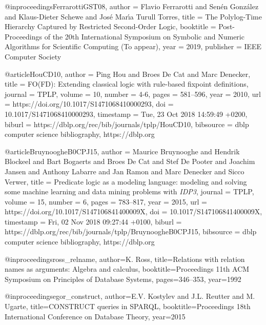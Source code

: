 \documentclass{article}
\begin{document}


@inproceedings{FerrarottiGST08,
  author    = {Flavio Ferrarotti and
               Sen{\'{e}}n Gonz{\'{a}}lez and
               Klaus-Dieter Schewe and
               Jos{\'{e}} Mar\'{\i}a {Turull Torres}},
  title     = {The Polylog-Time Hierarchy Captured by Restricted Second-Order Logic},
  booktitle = {Post-Proceedings of the 20th International Symposium on Symbolic and Numeric Algorithms for Scientific Computing (To appear)},
  year = {2019},
  publisher = {IEEE Computer Society}
}

@article{HouCD10,
  author    = {Ping Hou and
               Broes De Cat and
               Marc Denecker},
  title     = {{FO(FD):} Extending classical logic with rule-based fixpoint definitions},
  journal   = {{TPLP}},
  volume    = {10},
  number    = {4-6},
  pages     = {581--596},
  year      = {2010},
  url       = {https://doi.org/10.1017/S1471068410000293},
  doi       = {10.1017/S1471068410000293},
  timestamp = {Tue, 23 Oct 2018 14:59:49 +0200},
  biburl    = {https://dblp.org/rec/bib/journals/tplp/HouCD10},
  bibsource = {dblp computer science bibliography, https://dblp.org}
}

@article{BruynoogheB0CPJ15,
  author    = {Maurice Bruynooghe and
               Hendrik Blockeel and
               Bart Bogaerts and
               Broes De Cat and
               Stef De Pooter and
               Joachim Jansen and
               Anthony Labarre and
               Jan Ramon and
               Marc Denecker and
               Sicco Verwer},
  title     = {Predicate logic as a modeling language: modeling and solving some
               machine learning and data mining problems with \emph{IDP3}},
  journal   = {{TPLP}},
  volume    = {15},
  number    = {6},
  pages     = {783--817},
  year      = {2015},
  url       = {https://doi.org/10.1017/S147106841400009X},
  doi       = {10.1017/S147106841400009X},
  timestamp = {Fri, 02 Nov 2018 09:27:44 +0100},
  biburl    = {https://dblp.org/rec/bib/journals/tplp/BruynoogheB0CPJ15},
  bibsource = {dblp computer science bibliography, https://dblp.org}
}

@inproceedings{ross_relname,
author={K. Ross},
title={Relations with relation names as arguments: Algebra and calculus},
booktitle={Proceedings 11th ACM Symposium on Principles of Database Systems},
pages={346--353}, year={1992}}

@inproceedings{egor_construct,
  author={E.V. Kostylev and J.L. Reutter and M. Ugarte},
  title={{CONSTRUCT} queries in {SPARQL}}, booktitle={Proceedings
    18th International Conference on Database Theory}, year=2015}
\end{document}
